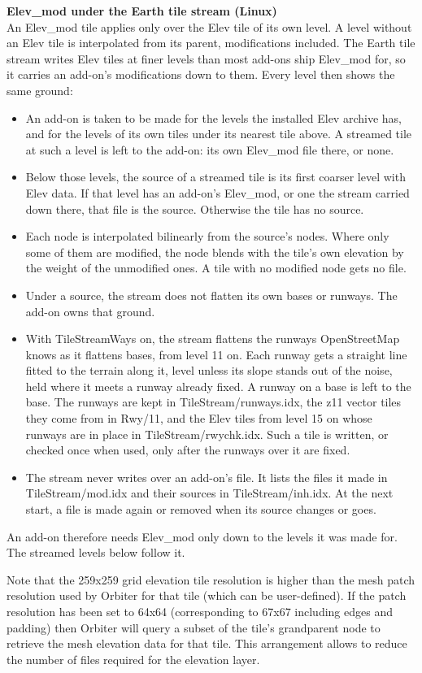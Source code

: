 \documentclass[Orbiter Developer Manual.tex]{subfiles}
\begin{document}
\noindent
\textbf{Elev\_mod under the Earth tile stream (Linux)}\\
An Elev\_mod tile applies only over the Elev tile of its own level. A level without an Elev tile is interpolated from its parent, modifications included. The Earth tile stream writes Elev tiles at finer levels than most add-ons ship Elev\_mod for, so it carries an add-on's modifications down to them. Every level then shows the same ground:
\begin{itemize}
\item An add-on is taken to be made for the levels the installed Elev archive has, and for the levels of its own tiles under its nearest tile above. A streamed tile at such a level is left to the add-on: its own Elev\_mod file there, or none.
\item Below those levels, the source of a streamed tile is its first coarser level with Elev data. If that level has an add-on's Elev\_mod, or one the stream carried down there, that file is the source. Otherwise the tile has no source.
\item Each node is interpolated bilinearly from the source's nodes. Where only some of them are modified, the node blends with the tile's own elevation by the weight of the unmodified ones. A tile with no modified node gets no file.
\item Under a source, the stream does not flatten its own bases or runways. The add-on owns that ground.
\item With TileStreamWays on, the stream flattens the runways OpenStreetMap knows as it flattens bases, from level 11 on. Each runway gets a straight line fitted to the terrain along it, level unless its slope stands out of the noise, held where it meets a runway already fixed. A runway on a base is left to the base. The runways are kept in TileStream/runways.idx, the z11 vector tiles they come from in Rwy/11, and the Elev tiles from level 15 on whose runways are in place in TileStream/rwychk.idx. Such a tile is written, or checked once when used, only after the runways over it are fixed.
\item The stream never writes over an add-on's file. It lists the files it made in TileStream/mod.idx and their sources in TileStream/inh.idx. At the next start, a file is made again or removed when its source changes or goes.
\end{itemize}
An add-on therefore needs Elev\_mod only down to the levels it was made for. The streamed levels below follow it.

\noindent
Note that the 259x259 grid elevation tile resolution is higher than the mesh patch resolution used by Orbiter for that tile (which can be user-defined). If the patch resolution has been set to 64x64 (corresponding to 67x67 including edges and padding) then Orbiter will query a subset of the tile's grandparent node to retrieve the mesh elevation data for that tile. This arrangement allows to reduce the number of files required for the elevation layer.
\end{document}
